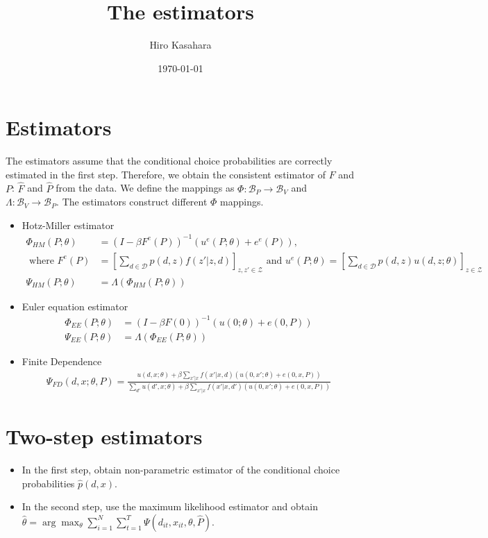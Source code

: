 \documentclass{article}
\title{The estimators}
\author{Hiro Kasahara}
\date{\today}
\begin{document}
\maketitle
\cite{Heidhues2018}
\section{Estimators}
The estimators assume that the conditional choice probabilities are correctly estimated in the first step.
Therefore, we obtain the consistent estimator of $F$ and $P$: $\hat{F}$ and $\hat{P}$ from the data.
We define the mappings as $\Phi : \mathcal{B}_{P} \to \mathcal{B}_{V}$ and $\Lambda: \mathcal{B}_{V} \to \mathcal{B}_{P}$.
The estimators construct different $\Phi$ mappings.
\begin{itemize}
  \item Hotz-Miller estimator \begin{equation}
  \begin{split}
          \Phi_{HM}(P;\theta) & = (I - \beta F^e(P))^{-1}( u^e(P;\theta) + e^e(P) ), \\
          \text{ where } F^e(P) & = \left[ \sum_{d \in \mathcal{D} } p(d,z) f(z'|z,d)\right]_{z,z' \in \mathcal{Z}}
          \text{ and } u^e(P;\theta)  = \left[ \sum_{d \in \mathcal{D} } p(d,z) u(d,z;\theta) \right]_{z \in \mathcal{Z}} \\
          \Psi_{HM}(P;\theta) & = \Lambda(\Phi_{HM}(P;\theta))
  \end{split}
  \end{equation}
  \item Euler equation estimator \begin{equation}
  \begin{split}
          \Phi_{EE}(P;\theta) & = (I - \beta F(0))^{-1}( u(0;\theta) + e(0,P))\\
          \Psi_{EE}(P;\theta) & = \Lambda(\Phi_{EE}(P;\theta))
  \end{split}
  \end{equation}
  \item Finite Dependence \[ \begin{split}
    \Psi_{FD}(d,x;\theta,P) = \frac{u(d,x;\theta) + \beta \sum_{x'|x}f(x'|x,d)(u(0,x';\theta) + e(0,x,P) ) }{ \sum_{d'} u(d',x;\theta) + \beta \sum_{x'|x}f(x'|x,d')(u(0,x';\theta) + e(0,x,P) )}
  \end{split} \]
\end{itemize}
\section{Two-step estimators}

\begin{itemize}
  \item In the first step, obtain non-parametric estimator of the conditional choice probabilities $\hat{p}(d,x)$.
  \item In the second step, use the maximum likelihood estimator and obtain $\hat{\theta} = \arg \max_{\theta} \sum_{i=1}^N \sum_{t=1}^T \Psi(d_{it},x_{it},\theta,\hat{P})$.
\end{itemize}



\end{document}
